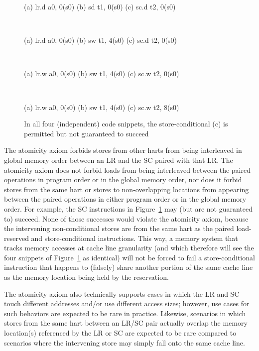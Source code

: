 \begin{figure}[h!]
  \centering\small
  \begin{verbbox}
  (a) lr.d a0, 0(s0)
  (b) sd   t1, 0(s0)
  (c) sc.d t2, 0(s0)
  \end{verbbox}
  \theverbbox
  ~~~~~~
  \begin{verbbox}
  (a) lr.d a0, 0(s0)
  (b) sw   t1, 4(s0)
  (c) sc.d t2, 0(s0)
  \end{verbbox}
  \theverbbox
  ~~~~~~
  \begin{verbbox}
  (a) lr.w a0, 0(s0)
  (b) sw   t1, 4(s0)
  (c) sc.w t2, 0(s0)
  \end{verbbox}
  \theverbbox
  ~~~~~~
  \begin{verbbox}
  (a) lr.w a0, 0(s0)
  (b) sw   t1, 4(s0)
  (c) sc.w t2, 8(s0)
  \end{verbbox}
  \theverbbox
  \caption{In all four (independent) code snippets, the store-conditional (c) is permitted but not guaranteed to succeed}
  \label{fig:litmus:lrsdsc}
\end{figure}

The atomicity axiom forbids stores from other harts from being interleaved in global memory order between an LR and the SC paired with that LR.
The atomicity axiom does not forbid loads from being interleaved between the paired operations in program order or in the global memory order, nor does it forbid stores from the same hart or stores to non-overlapping locations from appearing between the paired operations in either program order or in the global memory order.
For example, the SC instructions in Figure~\ref{fig:litmus:lrsdsc} may (but are not guaranteed to) succeed.
None of those successes would violate the atomicity axiom, because the intervening non-conditional stores are from the same hart as the paired load-reserved and store-conditional instructions.
This way, a memory system that tracks memory accesses at cache line granularity (and which therefore will see the four snippets of Figure~\ref{fig:litmus:lrsdsc} as identical) will not be forced to fail a store-conditional instruction that happens to (falsely) share another portion of the same cache line as the memory location being held by the reservation.

The atomicity axiom also technically supports cases in which the LR and SC touch different addresses and/or use different access sizes; however, use cases for such behaviors are expected to be rare in practice.
Likewise, scenarios in which stores from the same hart between an LR/SC pair actually overlap the memory location(s) referenced by the LR or SC are expected to be rare compared to scenarios where the intervening store may simply fall onto the same cache line.

